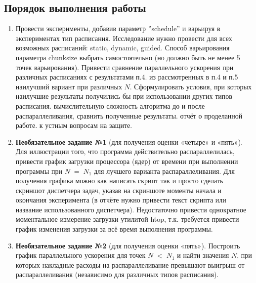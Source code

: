 { %
	\subsection{Порядок выполнения работы}
	\begin{enumerate}
		 во все for-циклы в программе из ЛР №1 следующую директиву OpenMP: \\	
''\#pragma omp parallel for default(none) private(...) shared(...)''. Наличие всех перечисленных параметров в указанной директиве является обязательным.
		 все for-циклы на внутренние зависимости по данным между итерациями. Если зависимости обнаружились, использовать для защиты критических секций директиву ''\#pragma omp critical'' или ''\#pragma omp atomic'' (если операция атомарна), или параметр reduction (предпочтительнее) или вообще отказаться от распараллеливания цикла (свой выбор необходимо обосновать).
		, что получившаяся программа обладает свойством прямой совместимости с компиляторами, не поддерживающими \\OpenMP (для проверки этого можно скомпилировать программу без опции ''–fopenmp'', в результате не должно быть сообщений об ошибках, а программа должна корректно работать).
		 эксперименты, замеряя параллельное ускорение. Привести сравнение графиков параллельного ускорения с ЛР №1 и ЛР №2.  
		\item Провести эксперименты, добавив параметр ''schedule'' и варьируя в экспериментах тип расписания. Исследование нужно провести для всех возможных расписаний: static, dynamic, guided. Способ варьирования параметра chunk\textunderscore size выбрать самостоятельно (но должно быть не менее 5 точек варьирования). Привести сравнение параллельного ускорения при различных расписаниях с результатами п.4.
		 из рассмотренных в п.4 и п.5 наилучший вариант при различных $N$. Сформулировать условия, при которых наилучшие результаты получились бы при использовании других типов расписания.
		 вычислительную сложность алгоритма до и после распараллеливания, сравнить полученные результаты.
		 отчёт о проделанной работе.
		 к устным вопросам на защите.
		\item\textbf{Необязательное задание №1} (для получения оценки «четыре» и «пять»). Для иллюстрации того, что программа действительно распараллелилась, привести график загрузки процессора (ядер) от времени при выполнении программы при $N\;=\;N_1$ для лучшего варианта распараллеливания. Для получения графика можно как написать скрипт 
так и просто сделать скриншот диспетчера задач, указав на скриншоте моменты начала и окончания эксперимента (в отчёте нужно привести текст скрипта или название использованного диспетчера). Недостаточно привести однократное  моментальное измерение загрузки утилитой htop, т.к. требуется привести график изменения загрузки за всё время выполнения программы.
		\item\textbf{Необязательное задание №2} (для получения оценки «пять»). Построить график параллельного ускорения для точек $N\;<\;N_1$ и найти значения $N$, при которых накладные расходы на распараллеливание превышают выигрыш от распараллеливания (независимо для различных типов расписания).
	\end{enumerate}
}